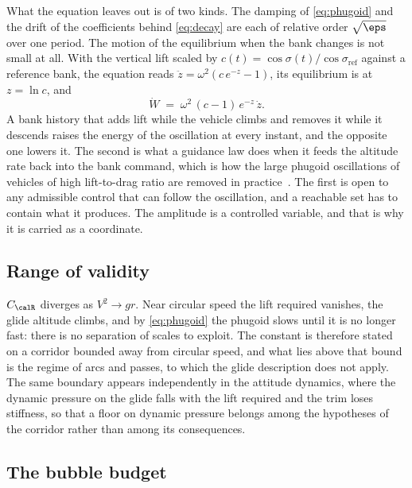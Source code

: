 What the equation leaves out is of two kinds. The damping of
\cref{eq:phugoid} and the drift of the coefficients behind \cref{eq:decay}
are each of relative order $\sqrt{\eps}$ over one period. The motion of the
equilibrium when the bank changes is not small at all. With the vertical
lift scaled by $c(t) = \cos\sigma(t)/\cos\sigma_{\mathrm{ref}}$ against a
reference bank, the equation reads $\ddot z = \omega^2(c\,e^{-z} - 1)$, its
equilibrium is at $z = \ln c$, and
\begin{equation}\label{eq:pumping}
  \dot{W} \;=\; \omega^2\,(c - 1)\,e^{-z}\,\dot z .
\end{equation}
A bank history that adds lift while the vehicle climbs and removes it while
it descends raises the energy of the oscillation at every instant, and the
opposite one lowers it. The second is what a guidance law does when it
feeds the altitude rate back into the bank command, which is how the large
phugoid oscillations of vehicles of high lift-to-drag ratio are removed in
practice~\cite{lu2014entry}. The first is open to any admissible control
that can follow the oscillation, and a reachable set has to contain what it
produces. The amplitude is a controlled variable, and that is why it is
carried as a coordinate.

\subsection{Range of validity}\label{sec:residual-range}

$C_{\calR}$ diverges as $V^2\to gr$. Near circular speed the lift required
vanishes, the glide altitude climbs, and by \cref{eq:phugoid} the phugoid
slows until it is no longer fast: there is no separation of scales to
exploit. The constant is therefore stated on a corridor bounded away from
circular speed, and what lies above that bound is the regime of arcs and
passes, to which the glide description does not apply. The same boundary
appears independently in the attitude dynamics, where the dynamic pressure
on the glide falls with the lift required and the trim loses stiffness, so
that a floor on dynamic pressure belongs among the hypotheses of the
corridor rather than among its consequences.

\subsection{The bubble budget}\label{sec:residual-budget}

